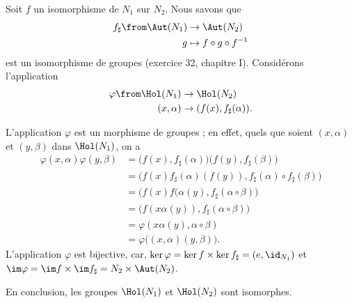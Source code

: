 Soit $f$ un isomorphisme de $N_1$ sur $N_2$.
Nous savons que
%
\begin{align*}
  f_\sharp\from\Aut(N_1) &\to \Aut(N_2) \\
  g &\mapsto f\circ g\circ f^{-1}
\end{align*}
%
est un isomorphisme de groupes (exercice 32, chapitre I).
Considérons l'application
\begin{align*}
  \varphi\from\Hol(N_1) &\to\Hol(N_2) \\
    (x, \alpha) &\to (f(x), f_\sharp(\alpha)).
\end{align*}

L'application $\varphi$ est un morphisme de groupes ; en effet, quels que soient  $(x, \alpha)$ et $(y, \beta)$ dans $\Hol(N_1)$, on a
\begin{align*}
  \varphi(x, \alpha) \varphi(y, \beta)
    &= \bigl( f(x), f_\sharp(\alpha) \bigr) \bigl( f(y), f_\sharp(\beta) \bigr) \\
    &= \bigl( f(x) f_\sharp(\alpha)(f(y)), f_\sharp(\alpha)\circ f_\sharp(\beta) \bigr) \\
    &= \bigl( f(x) f(\alpha(y), f_\sharp(\alpha\circ\beta) \bigr) \\
    &= \bigl( f(x\alpha(y)), f_\sharp(\alpha\circ\beta) \bigr) \\
    &= \varphi(x\alpha(y), \alpha\circ\beta) \\
    &= \varphi\bigl( (x, \alpha)(y, \beta) \bigr).
\end{align*}
%
L'application $\varphi$ est bijective, car, $\ker \varphi = \ker f  \times \ker f_\sharp = (e, \id_{N_1})$ et $\im \varphi = \im f \times \im f_\sharp = N_2\times\Aut(N_2)$.

En conclusion, les groupes $\Hol(N_1)$ et $\Hol(N_2)$ sont isomorphes.
